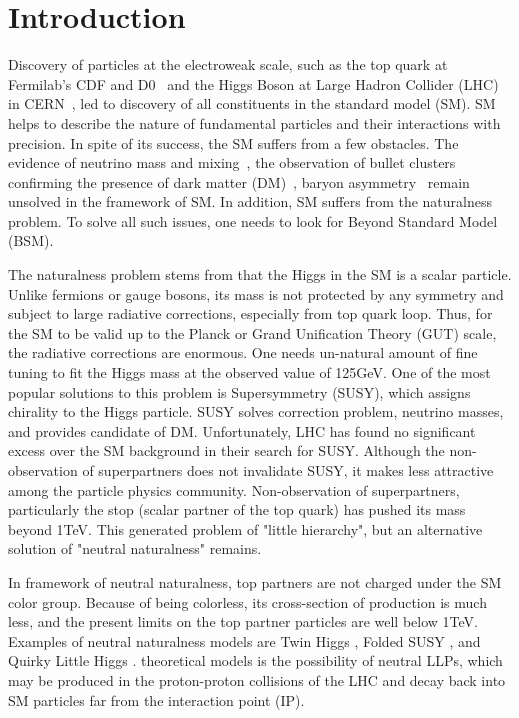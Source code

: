 \section{Introduction}\label{sec:introduction}

Discovery of particles at the electroweak scale, such as the top quark at Fermilab's CDF and D0~\cite{topD0,topCDF} and the Higgs Boson at Large Hadron Collider (LHC) in CERN~\cite{higgscms,higgsatlas}, led to discovery of all constituents in the standard model (SM). 
SM helps to describe the nature of fundamental particles and their interactions with precision. 
In spite of its success, the SM suffers from a few obstacles. 
The evidence of neutrino mass and mixing~\cite{neutrino}, the observation of bullet clusters confirming the presence of dark matter (DM)~\cite{Baumgart:2009tn,Kaplan:2009ag,Chan:2011aa,Dienes:2011ja,Dienes:2012yz}, baryon asymmetry~\cite{Cui:2014twa} remain unsolved in the framework of SM. 
In addition, SM suffers from the naturalness problem. 
To solve all such issues, one needs to look for Beyond Standard Model (BSM).

The naturalness problem stems from that the Higgs in the SM is a scalar particle. 
Unlike fermions or gauge bosons, its mass is not protected by any symmetry and subject to large radiative corrections, especially from top quark loop. 
Thus, for the SM to be valid up to the Planck or Grand Unification Theory (GUT) scale, the radiative corrections are enormous. 
One needs un-natural amount of fine tuning to fit the Higgs mass at the observed value of 125GeV.
One of the most popular solutions to this problem is Supersymmetry (SUSY), which assigns chirality to the Higgs particle. 
SUSY solves correction problem, neutrino masses, and provides candidate of DM. 
Unfortunately, LHC has found no significant excess over the SM background in their search for SUSY\cite{SUSY}. 
Although the non-observation of superpartners does not invalidate SUSY, it makes less attractive among the particle physics community. 
Non-observation of superpartners, particularly the stop (scalar partner of the top quark) has pushed its mass beyond 1TeV. 
This generated problem of "little hierarchy", but an alternative solution of "neutral naturalness" remains. 


In framework of neutral naturalness, top partners are not charged under the SM color group. 
Because of being colorless, its cross-section of production is much less, and the present limits on the top partner particles are well below 1TeV. 
Examples of neutral naturalness models are Twin Higgs \cite{Chacko:2005pe},
Folded SUSY \cite{Burdman:2006tz}, and Quirky Little Higgs \cite{Cai:2008au}.
theoretical models is the possibility of neutral LLPs, which may be produced in the proton-proton
collisions of the LHC and decay back into SM particles far from the interaction point (IP).


